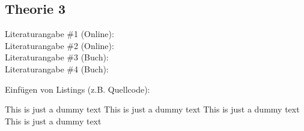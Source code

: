 \subsection{Theorie 3}
\label{sec:theorieC}

Literaturangabe \#1 (Online): \citep{max2007company} \\
Literaturangabe \#2 (Online): \parencite{example2017sdk} \\
Literaturangabe \#3 (Buch): \citep{place2014art} \\
Literaturangabe \#4 (Buch): \parencite{place2014art}

\bigskip

Einfügen von Listings (z.B. Quellcode):

\begin{center}
	\begin{minipage}[!h]{\textwidth}
		
	\end{minipage}
\end{center}
\bigskip

This is just a dummy text This is just a dummy text This is just a dummy text This is just a dummy text